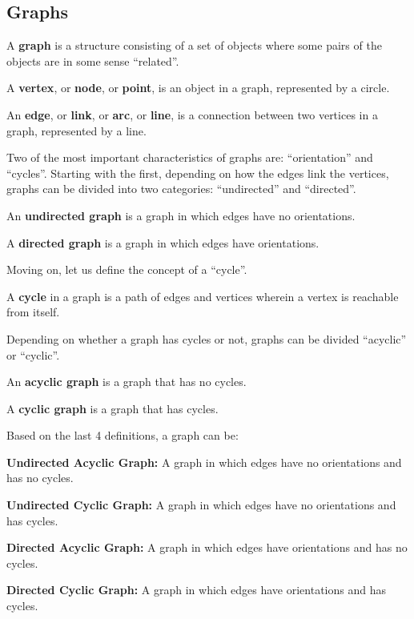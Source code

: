 
\subsection{Graphs}

\bd[Graph]
A \textbf{graph} is a structure consisting of a set of objects where some pairs of the objects are in some sense
``related''.
\ed

A \textbf{vertex}, or \textbf{node}, or \textbf{point}, is an object in a graph, represented by a circle.
\ed

An \textbf{edge}, or \textbf{link}, or \textbf{arc}, or \textbf{line}, is a connection between two vertices in a graph,
represented by a line.
\ed

Two of the most important characteristics of graphs are: ``orientation'' and ``cycles''. Starting with the first,
depending on how the edges link the vertices, graphs can be divided into two categories: ``undirected'' and ``directed''.

An \textbf{undirected graph} is a graph in which edges have no orientations.
\ed


A \textbf{directed graph} is a graph in which edges have orientations.
\ed


Moving on, let us define the concept of a ``cycle''.

\bd[Cycle]
A \textbf{cycle} in a graph is a path of edges and vertices wherein a vertex is reachable from itself.
\ed

Depending on whether a graph has cycles or not, graphs can be divided ``acyclic'' or ``cyclic''.

An \textbf{acyclic graph} is a graph that has no cycles.
\ed


A \textbf{cyclic graph} is a graph that has cycles.
\ed


Based on the last 4 definitions, a graph can be:
\bit
\item \textbf{Undirected Acyclic Graph:} A graph in which edges have no orientations and has no cycles.
\item \textbf{Undirected Cyclic Graph:} A graph in which edges have no orientations and has cycles.
\item \textbf{Directed Acyclic Graph:} A graph in which edges have orientations and has no cycles.
\item \textbf{Directed Cyclic Graph:} A graph in which edges have orientations and has cycles.
\eit

